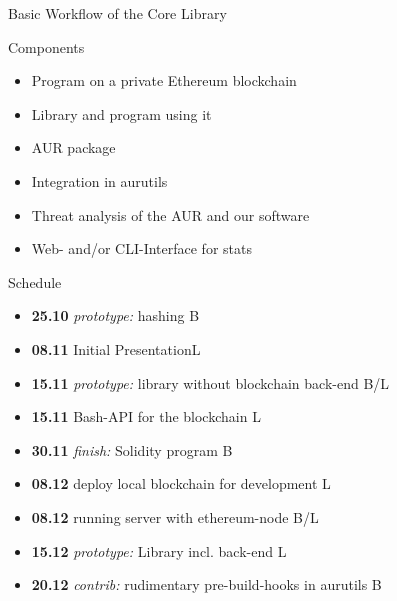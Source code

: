 \documentclass{beamer}
\begin{document}
\begin{frame}{Basic Workflow of the Core Library}
\end{frame}

\begin{frame}{Components}
\begin{itemize}
	\item Program on a private Ethereum blockchain
	\item Library and program using it
	\item AUR package
	\item Integration in aurutils
	\item Threat analysis of the AUR and our software
	\item Web- and/or CLI-Interface for stats
\end{itemize}
\end{frame}

\begin{frame}{Schedule}
\begin{itemize}
	\item \textbf{25.10} \emph{prototype:} hashing \hfill B
	\item \textbf{08.11} \alert{Initial Presentation}\hfill L
	\item \textbf{15.11} \emph{prototype:} library without blockchain back-end \hfill B/L
	\item \textbf{15.11} Bash-API for the blockchain \hfill L
	\item \textbf{30.11} \emph{finish:} \alert{Solidity program} \hfill B
	\item \textbf{08.12} deploy local blockchain for development \hfill L
	\item \textbf{08.12} running server with ethereum-node \hfill B/L
	\item \textbf{15.12} \emph{prototype:} \alert{Library} incl. back-end \hfill L
	\item \textbf{20.12} \emph{contrib:} rudimentary pre-build-hooks in aurutils \hfill B
\end{itemize}
\end{frame}
\end{document}
